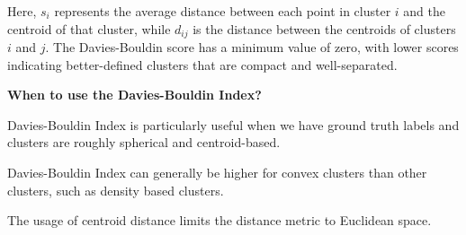 \begin{center}

\begin{center}
\end{center}


Here, \( s_i \) represents the average distance between each point in cluster \( i \) and the centroid of that cluster,
while \( d_{ij} \) is the distance between the centroids of clusters \( i \) and \( j \). The Davies-Bouldin score has a
minimum value of zero, with lower scores indicating better-defined clusters that are compact and well-separated.

\textbf{When to use the Davies-Bouldin Index?}

Davies-Bouldin Index is particularly useful when we have ground truth labels and clusters are roughly spherical and centroid-based.

{
\item Davies-Bouldin Index can generally be higher for convex clusters than other clusters, such as density based clusters.
\item The usage of centroid distance limits the distance metric to Euclidean space.
}


\end{center}
